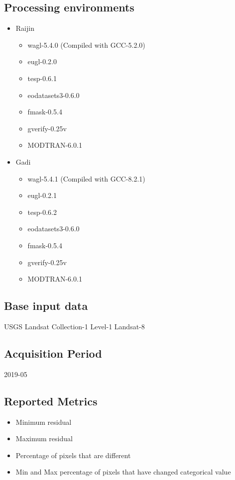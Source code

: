 \documentclass[a4paper]{article}
\begin{document}
    \subsection{Processing environments}
    \label{sec:environ}
      \begin{itemize}
        \item Raijin
          \begin{itemize}
            \item wagl-5.4.0 (Compiled with GCC-5.2.0)
            \item eugl-0.2.0
            \item tesp-0.6.1
            \item eodatasets3-0.6.0
            \item fmask-0.5.4
            \item gverify-0.25v
            \item MODTRAN-6.0.1
          \end{itemize}
        \item Gadi
          \begin{itemize}
            \item wagl-5.4.1 (Compiled with GCC-8.2.1)
            \item eugl-0.2.1
            \item tesp-0.6.2
            \item eodatasets3-0.6.0
            \item fmask-0.5.4
            \item gverify-0.25v
            \item MODTRAN-6.0.1
          \end{itemize}
      \end{itemize}

    \subsection{Base input data}

      USGS Landsat Collection-1 Level-1 Landsat-8

    \subsection{Acquisition Period}

      2019-05

    \subsection{Reported Metrics}
      \begin{itemize}
        \item Minimum residual
        \item Maximum residual
        \item Percentage of pixels that are different
        \item Min and Max percentage of pixels that have changed categorical value
      \end{itemize}
\end{document}
